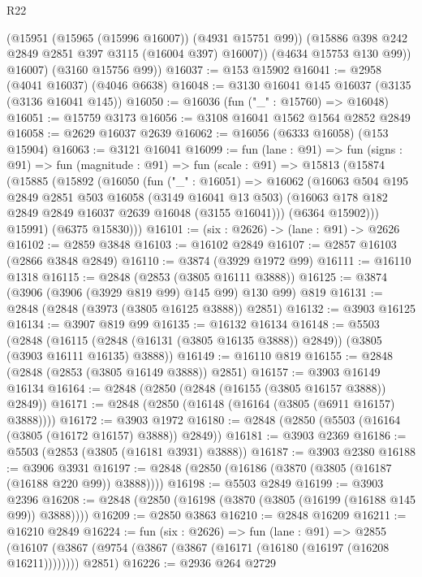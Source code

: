 \begin{lexlean}{R22}
\begin{coremodule}
            (@15951 (@15965 (@15996 @16007)) (@4931 @15751 @99))
            (@15886 @398 @242 @2849 @2851 @397 @3115 (@16004 @397) @16007))
          (@4634 @15753 @130 @99))
        @16007)
      (@3160 @15756 @99))
@16037 := @153 @15902
@16041 := @2958 (@4041 @16037) (@4046 @6638)
@16048 := @3130 @16041 @145 @16037 (@3135 (@3136 @16041 @145))
@16050 := @16036 (fun ("_" : @15760) => @16048)
@16051 := @15759 @3173
@16056 := @3108 @16041 @1562 @1564 @2852 @2849
@16058 := @2629 @16037 @2639
@16062 := @16056 (@6333 @16058) (@153 @15904)
@16063 := @3121 @16041
@16099 := fun (lane : @91) =>
  fun (signs : @91) =>
  fun (magnitude : @91) =>
  fun (scale : @91) =>
  @15813
    (@15874
      (@15885
        (@15892
          (@16050
            (fun ("_" : @16051) =>
            @16062
              (@16063
                @504
                @195
                @2849
                @2851
                @503
                @16058
                (@3149 @16041 @13 @503)
                (@16063 @178 @182 @2849 @2849 @16037 @2639 @16048 (@3155 @16041)))
              (@6364 @15902)))
          @15991)
        (@6375 @15830)))
@16101 := (six : @2626) -> (lane : @91) -> @2626
@16102 := @2859 @3848
@16103 := @16102 @2849
@16107 := @2857 @16103 (@2866 @3848 @2849)
@16110 := @3874 (@3929 @1972 @99)
@16111 := @16110 @1318
@16115 := @2848 (@2853 (@3805 @16111 @3888))
@16125 := @3874 (@3906 (@3906 (@3929 @819 @99) @145 @99) @130 @99) @819
@16131 := @2848 (@2848 (@3973 (@3805 @16125 @3888)) @2851)
@16132 := @3903 @16125
@16134 := @3907 @819 @99
@16135 := @16132 @16134
@16148 := @5503
    (@2848 (@16115 (@2848 (@16131 (@3805 @16135 @3888)) @2849)) (@3805 (@3903 @16111 @16135) @3888))
@16149 := @16110 @819
@16155 := @2848 (@2848 (@2853 (@3805 @16149 @3888)) @2851)
@16157 := @3903 @16149 @16134
@16164 := @2848 (@2850 (@2848 (@16155 (@3805 @16157 @3888)) @2849))
@16171 := @2848 (@2850 (@16148 (@16164 (@3805 (@6911 @16157) @3888))))
@16172 := @3903 @1972
@16180 := @2848 (@2850 (@5503 (@16164 (@3805 (@16172 @16157) @3888)) @2849))
@16181 := @3903 @2369
@16186 := @5503 (@2853 (@3805 (@16181 @3931) @3888))
@16187 := @3903 @2380
@16188 := @3906 @3931
@16197 := @2848 (@2850 (@16186 (@3870 (@3805 (@16187 (@16188 @220 @99)) @3888))))
@16198 := @5503 @2849
@16199 := @3903 @2396
@16208 := @2848 (@2850 (@16198 (@3870 (@3805 (@16199 (@16188 @145 @99)) @3888))))
@16209 := @2850 @3863
@16210 := @2848 @16209
@16211 := @16210 @2849
@16224 := fun (six : @2626) =>
  fun (lane : @91) =>
  @2855 (@16107 (@3867 (@9754 (@3867 (@3867 (@16171 (@16180 (@16197 (@16208 @16211)))))))) @2851)
@16226 := @2936 @264 @2729

\end{coremodule}
\end{lexlean}
